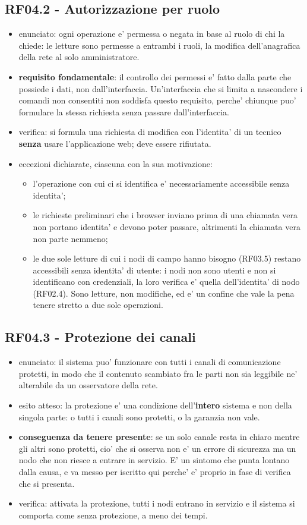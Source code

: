 \documentclass[11pt]{article}
\begin{document}
\subsection{RF04.2 - Autorizzazione per ruolo}
\label{sec:org203ec1a}
\begin{itemize}
\item enunciato: ogni operazione e' permessa o negata in base al ruolo di chi la chiede: le letture sono
permesse a entrambi i ruoli, la modifica dell'anagrafica della rete al solo amministratore.
\item \textbf{requisito fondamentale}: il controllo dei permessi e' fatto dalla parte che possiede i dati, non
dall'interfaccia. Un'interfaccia che si limita a nascondere i comandi non consentiti non soddisfa
questo requisito, perche' chiunque puo' formulare la stessa richiesta senza passare
dall'interfaccia.
\item verifica: si formula una richiesta di modifica con l'identita' di un tecnico \textbf{senza} usare
l'applicazione web; deve essere rifiutata.
\item eccezioni dichiarate, ciascuna con la sua motivazione:
\begin{itemize}
\item l'operazione con cui ci si identifica e' necessariamente accessibile senza identita';
\item le richieste preliminari che i browser inviano prima di una chiamata vera non portano identita' e
devono poter passare, altrimenti la chiamata vera non parte nemmeno;
\item le due sole letture di cui i nodi di campo hanno bisogno (RF03.5) restano accessibili senza
identita' di utente: i nodi non sono utenti e non si identificano con credenziali, la loro
verifica e' quella dell'identita' di nodo (RF02.4). Sono letture, non modifiche, ed e' un confine
che vale la pena tenere stretto a due sole operazioni.
\end{itemize}
\end{itemize}
\subsection{RF04.3 - Protezione dei canali}
\label{sec:orga6a71cf}
\begin{itemize}
\item enunciato: il sistema puo' funzionare con tutti i canali di comunicazione protetti, in modo che il
contenuto scambiato fra le parti non sia leggibile ne' alterabile da un osservatore della rete.
\item esito atteso: la protezione e' una condizione dell'\textbf{intero} sistema e non della singola parte: o
tutti i canali sono protetti, o la garanzia non vale.
\item \textbf{conseguenza da tenere presente}: se un solo canale resta in chiaro mentre gli altri sono protetti,
cio' che si osserva non e' un errore di sicurezza ma un nodo che non riesce a entrare in servizio.
E' un sintomo che punta lontano dalla causa, e va messo per iscritto qui perche' e' proprio in
fase di verifica che si presenta.
\item verifica: attivata la protezione, tutti i nodi entrano in servizio e il sistema si comporta come
senza protezione, a meno dei tempi.
\end{itemize}
\end{document}
